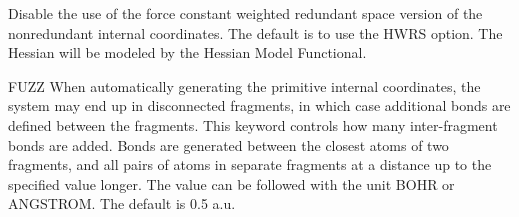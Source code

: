 \begin{keywordlist}
Disable the use of the force constant weighted redundant space version of the
nonredundant internal coordinates. The default is to use the HWRS option.
The Hessian will be modeled by the Hessian Model Functional.
\item[FUZZ]
When automatically generating the primitive internal coordinates, the system may
end up in disconnected fragments, in which case additional bonds are defined
between the fragments.
This keyword controls how many inter-fragment bonds are added. Bonds are generated
between the closest atoms of two fragments, and all pairs of atoms in separate
fragments at a distance up to the specified value longer.
The value can be followed with the unit BOHR or ANGSTROM. The default is 0.5 a.u.
\end{keywordlist}

